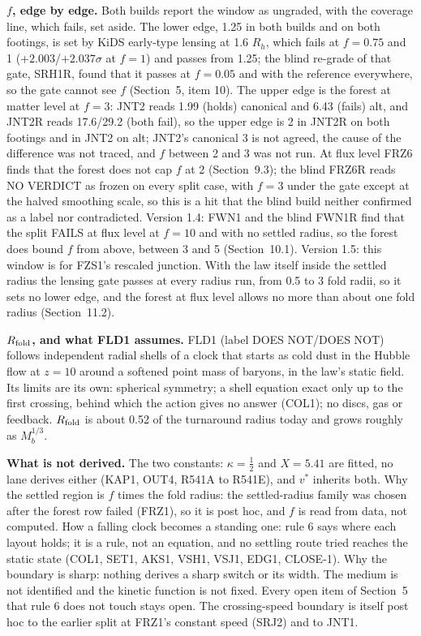 \documentclass[10pt]{article}
\begin{document}
\textbf{$f$, edge by edge.} Both builds report the window as ungraded, with the coverage line, which fails, set aside. The lower edge, 1.25 in both builds and on both footings, is set by KiDS early-type lensing at 1.6 $R_h$, which fails at $f=0.75$ and 1 ($+2.003$/$+2.037\sigma$ at $f=1$) and passes from 1.25; the blind re-grade of that gate, SRH1R, found that it passes at $f=0.05$ and with the reference everywhere, so the gate cannot see $f$ (Section~5, item 10). The upper edge is the forest at matter level at $f=3$: JNT2 reads 1.99 (holds) canonical and 6.43 (fails) alt, and JNT2R reads 17.6/29.2 (both fail), so the upper edge is 2 in JNT2R on both footings and in JNT2 on alt; JNT2's canonical 3 is not agreed, the cause of the difference was not traced, and $f$ between 2 and 3 was not run. At flux level FRZ6 finds that the forest does not cap $f$ at 2 (Section~9.3); the blind FRZ6R reads NO VERDICT as frozen on every split case, with $f=3$ under the gate except at the halved smoothing scale, so this is a hit that the blind build neither confirmed as a label nor contradicted. Version 1.4: FWN1 and the blind FWN1R find that the split FAILS at flux level at $f=10$ and with no settled radius, so the forest does bound $f$ from above, between 3 and 5 (Section~10.1). Version 1.5: this window is for FZS1's rescaled junction. With the law itself inside the settled radius the lensing gate passes at every radius run, from 0.5 to 3 fold radii, so it sets no lower edge, and the forest at flux level allows no more than about one fold radius (Section~11.2).

\textbf{$R_{\rm fold}$, and what FLD1 assumes.} FLD1 (label DOES NOT/DOES NOT) follows independent radial shells of a clock that starts as cold dust in the Hubble flow at $z=10$ around a softened point mass of baryons, in the law's static field. Its limits are its own: spherical symmetry; a shell equation exact only up to the first crossing, behind which the action gives no answer (COL1); no discs, gas or feedback. $R_{\rm fold}$ is about 0.52 of the turnaround radius today and grows roughly as $M_b^{1/3}$.

\textbf{What is not derived.} The two constants: $\kappa=\tfrac12$ and $X=5.41$ are fitted, no lane derives either (KAP1, OUT4, R541A to R541E), and $v^*$ inherits both. Why the settled region is $f$ times the fold radius: the settled-radius family was chosen after the forest row failed (FRZ1), so it is post hoc, and $f$ is read from data, not computed. How a falling clock becomes a standing one: rule 6 says where each layout holds; it is a rule, not an equation, and no settling route tried reaches the static state (COL1, SET1, AKS1, VSH1, VSJ1, EDG1, CLOSE-1). Why the boundary is sharp: nothing derives a sharp switch or its width. The medium is not identified and the kinetic function is not fixed. Every open item of Section~5 that rule 6 does not touch stays open. The crossing-speed boundary is itself post hoc to the earlier split at FRZ1's constant speed (SRJ2) and to JNT1.
\end{document}
